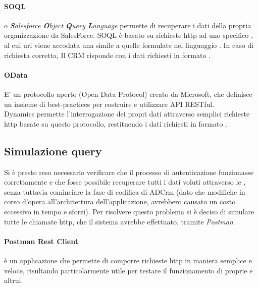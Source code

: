 \documentclass[12pt,a4paper,twoside,openany,english]{book}
\begin{document}
			\paragraph{SOQL}
			o \textit{\textbf{S}alesforce \textbf{O}bject \textbf{Q}uery \textbf{L}anguage} permette di recuperare i dati della propria organizzazione da SalesForce. SOQL è basato su richieste http ad uno specifico , al cui url viene accodata una  simile a quelle formulate nel linguaggio . In caso di richiesta corretta, Il CRM risponde con i dati richiesti in formato .
			\paragraph{OData}
			E' un protocollo aperto (Open Data Protocol) creato da Microsoft, che definisce un insieme di best-practices per costruire e utilizzare API RESTful.\\
			Dynamics permette l'interrogazione dei propri dati attraverso semplici richieste http basate su questo protocollo, restituendo i dati richiesti in formato .
			
		\subsection{Simulazione query}
			Si è presto reso necessario verificare che il processo di autenticazione funzionasse correttamente e che fosse possibile recuperare tutti i dati voluti attraverso le , senza tuttavia cominciare la fase di codifica di ADCrm (dato che modifiche in corso d'opera all'architettura dell'applicazione, avrebbero causato un costo eccessivo in tempo e sforzi).
			Per risolvere questo problema si è deciso di simulare tutte le chiamate http, che il sistema avrebbe effettuato, tramite \textit{Postman}.
			\paragraph{Postman Rest Client} è un applicazione che permette di comporre richieste http in maniera semplice e veloce, risultando particolarmente utile per testare il funzionamento di  proprie e altrui.
			\par
						
\end{document}
